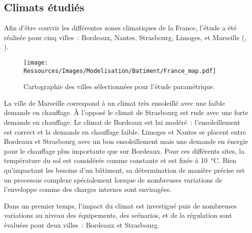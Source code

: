 \subsection{Climats étudiés} %
\label{sub:climats_etudies}
Afin d’être couvrir les différentes zones climatiques de la France, l’étude a été réalisée
pour cinq villes~: Bordeaux, Nantes, Strasbourg, Limoges, et Marseille (,
).

\begin{figure}
    \centering
    \texttt{[image: Ressources/Images/Modelisation/Batiment/France\_map.pdf]}
    \caption[Cartographie des villes sélectionnées pour l’étude paramétrique]
            {Cartographie des villes sélectionnées pour l’étude paramétrique.}
    \label{fig:carte_france}
\end{figure}

La ville de Marseille correspond à un climat très ensoleillé avec une faible demande en
chauffage. À l’opposé le climat de Strasbourg est rude avec
une forte demande en chauffage. Le climat de Bordeaux est lui modéré~: l’ensoleillement est correct
et la demande en chauffage faible. Limoges et Nantes se placent entre Bordeaux et
Strasbourg avec un bon ensoleillement mais une demande en énergie pour le chauffage plus
importante que sur Bordeaux. Pour ces différents sites, la température du sol est
considérée comme constante et est fixée à \SI{10}{\celsius}. Bien qu’impactant les besoins
d’un bâtiment, sa détermination de manière précise est un processus complexe spécialement
lorsque de nombreuses variations de l’enveloppe comme des charges internes sont envisagées.

Dans un premier temps, l’impact du climat est investigué puis de nombreuses variations au
niveau des équipements, des scénarios, et de la régulation sont évaluées pour deux
villes~: Bordeaux et Strasbourg.

